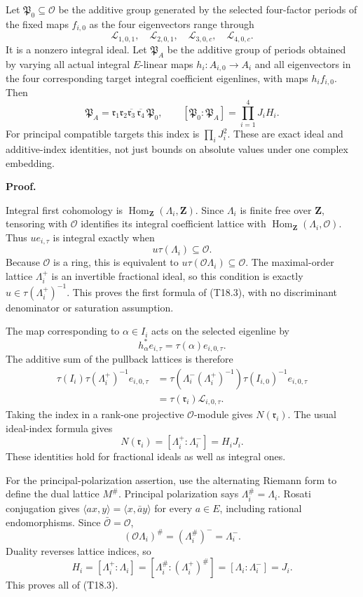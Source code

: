\documentclass[11pt,a4paper]{article}
\theoremstyle{definition}
\begin{document}
Let \(\mathfrak P_0\subseteq\mathcal O\) be the additive group generated by the selected four-factor periods of the fixed maps \(f_{i,0}\) as the four eigenvectors range through \[
\mathcal L_{1,0,1},\quad\mathcal L_{2,0,1},\quad
\mathcal L_{3,0,c},\quad\mathcal L_{4,0,c}.
\] It is a nonzero integral ideal. Let \(\mathfrak P_A\) be the additive group of periods obtained by varying all actual integral \(E\)-linear maps \(h_i:A_{i,0}\to A_i\) and all eigenvectors in the four corresponding target integral coefficient eigenlines, with maps \(h_if_{i,0}\). Then \[
\mathfrak P_A
=\mathfrak r_1\mathfrak r_2\overline{\mathfrak r_3}\,
             \overline{\mathfrak r_4}\,\mathfrak P_0,
\qquad
[\mathfrak P_0:\mathfrak P_A]=\prod_{i=1}^4J_iH_i.
\tag{T18.4}
\] For principal compatible targets this index is \(\prod_iJ_i^2\). These are exact ideal and additive-index identities, not just bounds on absolute values under one complex embedding.

\textbf{Proof.}

Integral first cohomology is \(\operatorname{Hom}_{\mathbf Z}(\Lambda_i,\mathbf Z)\). Since \(\Lambda_i\) is finite free over \(\mathbf Z\), tensoring with \(\mathcal O\) identifies its integral coefficient lattice with \(\operatorname{Hom}_{\mathbf Z}(\Lambda_i,\mathcal O)\). Thus \(u e_{i,\tau}\) is integral exactly when \[
u\tau(\Lambda_i)\subseteq\mathcal O.
\] Because \(\mathcal O\) is a ring, this is equivalent to \(u\tau(\mathcal O\Lambda_i)\subseteq\mathcal O\). The maximal-order lattice \(\Lambda_i^+\) is an invertible fractional ideal, so this condition is exactly \(u\in\tau(\Lambda_i^+)^{-1}\). This proves the first formula of (T18.3), with no discriminant denominator or saturation assumption.

The map corresponding to \(\alpha\in I_i\) acts on the selected eigenline by \[
h_\alpha^*e_{i,\tau}=\tau(\alpha)e_{i,0,\tau}.
\] The additive sum of the pullback lattices is therefore \[
\begin{aligned}
\tau(I_i)\tau(\Lambda_i^+)^{-1}e_{i,0,\tau}
&=\tau(\Lambda_i^-(\Lambda_i^+)^{-1})
  \tau(I_{i,0})^{-1}e_{i,0,\tau}\\
&=\tau(\mathfrak r_i)\mathcal L_{i,0,\tau}.
\end{aligned}
\] Taking the index in a rank-one projective \(\mathcal O\)-module gives \(N(\mathfrak r_i)\). The usual ideal-index formula gives \[
N(\mathfrak r_i)=[\Lambda_i^+:\Lambda_i^-]=H_iJ_i.
\] These identities hold for fractional ideals as well as integral ones.

For the principal-polarization assertion, use the alternating Riemann form to define the dual lattice \(M^\#\). Principal polarization says \(\Lambda_i^\#=\Lambda_i\). Rosati conjugation gives \(\langle ax,y\rangle=\langle x,\bar a y\rangle\) for every \(a\in E\), including rational endomorphisms. Since \(\bar{\mathcal O}=\mathcal O\), \[
(\mathcal O\Lambda_i)^\#=(\Lambda_i^\#)^-=\Lambda_i^-.
\] Duality reverses lattice indices, so \[
H_i=[\Lambda_i^+:\Lambda_i]
=[\Lambda_i^\#:(\Lambda_i^+)^\#]
=[\Lambda_i:\Lambda_i^-]=J_i.
\] This proves all of (T18.3).
\end{document}
